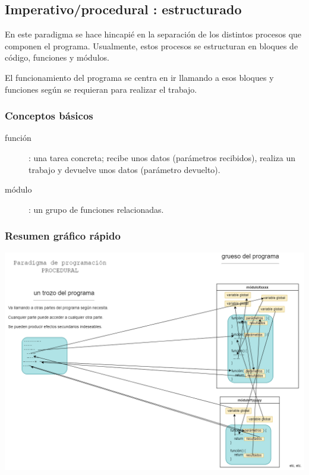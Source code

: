 \documentclass[spanish,12pt,a4paper,final,oneside]{book}
\begin{document}
\subsection{Imperativo/procedural : estructurado}
En este paradigma se hace hincapié en la separación de los distintos procesos que componen el programa. Usualmente, estos procesos se estructuran en bloques de código, funciones y módulos. 

El funcionamiento del programa se centra en ir llamando a esos bloques y funciones según se requieran para realizar el trabajo.

\subsubsection*{Conceptos básicos}
\begin{description}
\item[función]: una tarea concreta; recibe unos datos (parámetros recibidos), realiza un trabajo y devuelve unos datos (parámetro devuelto).
\item[módulo]: un grupo de funciones relacionadas.
\end{description}

\subsubsection*{Resumen gráfico rápido}
\includegraphics[width=\textwidth]{Paradigma de programacion - PROCEDURAL}
\end{document}
